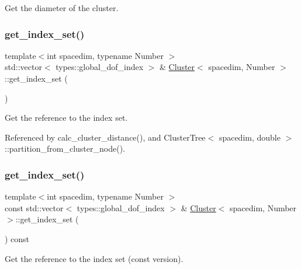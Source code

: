 Get the diameter of the cluster. \mbox{\label{classCluster_ada8786f2258b9fbeed2ed04bc1007c89}} 
\subsubsection{\texorpdfstring{get\+\_\+index\+\_\+set()}{get\_index\_set()}\hspace{0.1cm}{\footnotesize\ttfamily [1/2]}}
{\footnotesize\ttfamily template$<$int spacedim, typename Number $>$ \\
std\+::vector$<$ types\+::global\+\_\+dof\+\_\+index $>$ \& \hyperlink{classCluster}{Cluster}$<$ spacedim, Number $>$\+::get\+\_\+index\+\_\+set (\begin{DoxyParamCaption}{ }\end{DoxyParamCaption})}

Get the reference to the index set. 

Referenced by calc\+\_\+cluster\+\_\+distance(), and Cluster\+Tree$<$ spacedim, double $>$\+::partition\+\_\+from\+\_\+cluster\+\_\+node().

\mbox{\label{classCluster_acd4c3a1c712aca32cffefb64f88a1b08}} 
\subsubsection{\texorpdfstring{get\+\_\+index\+\_\+set()}{get\_index\_set()}\hspace{0.1cm}{\footnotesize\ttfamily [2/2]}}
{\footnotesize\ttfamily template$<$int spacedim, typename Number $>$ \\
const std\+::vector$<$ types\+::global\+\_\+dof\+\_\+index $>$ \& \hyperlink{classCluster}{Cluster}$<$ spacedim, Number $>$\+::get\+\_\+index\+\_\+set (\begin{DoxyParamCaption}{ }\end{DoxyParamCaption}) const}

Get the reference to the index set (const version). \mbox{\label{classCluster_ad70ce1f046bb3b47fff585eaf6ec4856}} 
